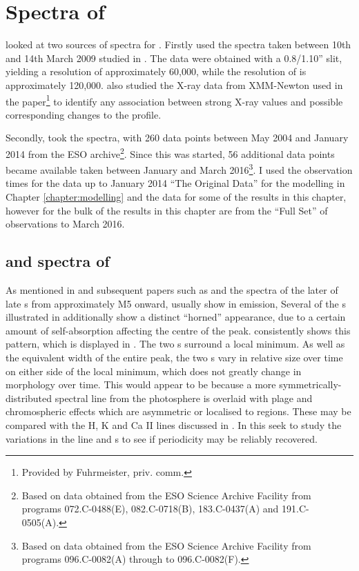 \chapter{Spectra of \prox} %
\protect\label{chapter:proxima}

{\FirstP} looked at two sources of spectra for \prox. Firstly {\Firstp} used the {\uves} spectra taken between 10th and
14th March 2009 studied in \citet{fuhrmeister11}. The {\uves} data were obtained with a 0.8/1.10'' slit, yielding a
resolution of approximately 60,000, while the resolution of {\harps} is approximately 120,000. {\FirstP} also studied
the X-ray data from XMM-Newton used in the \citet{fuhrmeister11} paper\footnote{Provided by Fuhrmeister, priv. comm.} to
identify any association between strong X-ray values and possible corresponding changes to the {\ha} profile.

Secondly, {\Firstp} took the {\harps} spectra, with 260 data points between May 2004 and January 2014 from the ESO
archive\footnote{Based on data obtained from the ESO Science Archive Facility from programs 072.C-0488(E),
  082.C-0718(B), 183.C-0437(A) and 191.C-0505(A).}. Since this {\paperorthesis} was started, 56 additional {\harps} data
points became available taken between January and March 2016\footnote{Based on data obtained from the ESO Science
  Archive Facility from programs 096.C-0082(A) through to 096.C-0082(F).}. I used the observation times for the data up
to January 2014 ``The Original Data'' for the modelling in Chapter \ref{chapter:modelling} and the data for some of the
results in this chapter, however for the bulk of the results in this chapter are from the ``Full Set'' of observations
to March 2016.

\section{{\harps} and {\uves} spectra of \prox}

As mentioned in \citet{mohanty03} and subsequent papers such as \citet{jenkins09} and \citet{barnes14} the spectra of
the later of late \rdwarf s from approximately M5 onward, usually show {\ha} in emission, Several of the \rdwarf s
illustrated in \citet[Fig. 6]{barnes14} additionally show a distinct ``horned'' appearance, due to a certain amount of
self-absorption affecting the centre of the {\ha} peak. {\prox} consistently shows this pattern, which is displayed in
\citet[Fig. 14]{fuhrmeister11}. The two \horn s surround a local minimum. As well as the equivalent width of the entire
{\ha} peak, the two \horn s vary in relative size over time on either side of the local minimum, which does not greatly
change in morphology over time. This would appear to be because a more symmetrically-distributed spectral line from the
photosphere is overlaid with plage and chromospheric effects which are asymmetric or localised to regions. These may be
compared with the H, K and Ca II lines discussed in \citet{rauscher06}. In this {\paperorthesis} {\Firstp} seek to study
the variations in the line and \horn s to see if periodicity may be reliably recovered.


